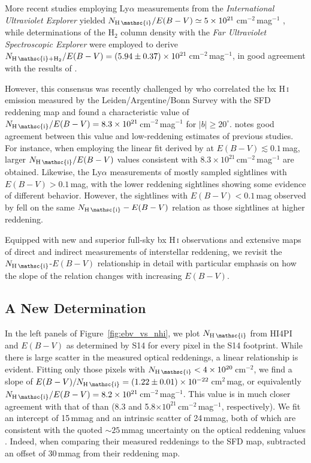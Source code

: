 \documentclass[iop,apj]{emulateapj}
\makeatletter
\def\testbx{bx}%
\DeclareRobustCommand{\ion}[2]{%
\relax\ifmmode
\ifx\testbx\f@series
{\mathbf{#1\,\mathsc{#2}}}\else
{\mathrm{#1\,\mathsc{#2}}}\fi
\else\textup{#1\,{\mdseries\textsc{#2}}}%
\fi}
\makeatother
\begin{document}
More recent studies employing Ly$\alpha$ measurements from the {\it International Ultraviolet Explorer} yielded $N_\ion{H}{i}/E(B-V) \simeq 5\times10^{21}$\,cm$^{-2}$\,mag$^{-1}$  \citep{Shull+vanSteenberg_1985, Diplas+Savage_1994}, while determinations of the H$_2$ column density with the {\it Far Ultraviolet Spectroscopic Explorer} were employed to derive $N_{\ion{H}{i}+{\rm H}_2}/E(B-V) = \left(5.94\pm0.37\right)\times10^{21}$\,cm$^{-2}$\,mag$^{-1}$, in good agreement with the results of \citet{Bohlin+Savage+Drake_1978}.

However, this consensus was recently challenged by \citet{Liszt_2014a,Liszt_2014b} who correlated the \ion{H}{i} emission measured by the Leiden/Argentine/Bonn Survey \citep{Kalberla+etal_2005} with the SFD reddening map and found a characteristic value of $N_\ion{H}{i}/E(B-V) = 
8.3\times10^{21}$\,cm$^{-2}$\,mag$^{-1}$ for $|b| \geq 20^\circ$. \citet{Liszt_2014a} notes good agreement between this value and low-reddening estimates of previous studies. For instance, when employing the linear fit derived by \citet{Heiles_1976} at $E(B-V) \lesssim 0.1$\,mag, larger $N_\ion{H}{i}/E(B-V)$ values consistent with $8.3\times10^{21}$\,cm$^{-2}$\,mag$^{-1}$ are obtained. Likewise, the Ly$\alpha$ measurements of \citet{Diplas+Savage_1994} mostly sampled sightlines with $E(B-V) > 0.1$\,mag, with the lower reddening sightlines showing some evidence of different behavior. However, the sightlines with $E(B-V) < 0.1$\,mag observed by \citet{Bohlin+Savage+Drake_1978} fell on the same $N_\ion{H}{i}-E(B-V)$ relation as those sightlines at higher reddening.

Equipped with new and superior full-sky \ion{H}{i} observations and extensive maps of direct and indirect measurements of interstellar reddening, we revisit the $N_\ion{H}{i}$-$E(B-V)$ relationship in detail with particular emphasis on how the slope of the relation changes with increasing $E(B-V)$.

\subsection{A New Determination}

In the left panels of Figure~\ref{fig:ebv_vs_nhi}, we plot $N_\ion{H}{i}$ from HI4PI and $E(B-V)$ as determined by S14 for every pixel in the S14 footprint. While there is large scatter in the measured optical reddenings, a linear relationship is evident. Fitting only those pixels with $N_\ion{H}{i} < 4\times10^{20}$\,cm$^{-2}$, we find a slope of $E(B-V)/N_\ion{H}{i} = \left(1.22\pm0.01\right)\times10^{-22}$\,cm$^2$\,mag, or equivalently $N_\ion{H}{i}/E(B-V) = 8.2\times10^{21}$\,cm$^{-2}$\,mag$^{-1}$. This value is in much closer agreement with that of \citet{Liszt_2014a} than \citet{Bohlin+Savage+Drake_1978} (8.3 and 5.8$\times10^{21}$\,cm$^{-2}$\,mag$^{-1}$, respectively). We fit an intercept of 15\,mmag and an intrinsic scatter of 24\,mmag, both of which are consistent with the quoted $\sim25$\,mmag uncertainty on the optical reddening values \citep{Schlafly+etal_2014}. Indeed, when comparing their measured reddenings to the SFD map, \citet{Schlafly+etal_2014} subtracted an offset of 30\,mmag from their reddening map.
\end{document}
